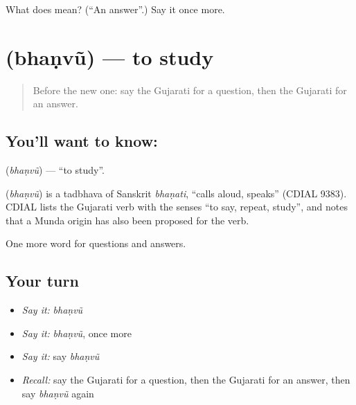\begin{tcolorbox}[breakable,colback=teal!4,colframe=teal!35!black,title={Before you move on}]
What does  mean? (\textquotedblleft{}An answer\textquotedblright{}.) Say it once more.
\end{tcolorbox}
\section[\texorpdfstring{\gu{ભણવું} (bhaṇvũ)}{ભણવું (bhaṇvũ)}]{ (bhaṇvũ) — to study}

\label{lesson:GU-C89-bhanvu}



\begin{quote}
Before the new one: say the Gujarati for a question, then the Gujarati for an answer.
\end{quote}

\subsection*{You'll want to know: }
\textbf{} (\emph{bhaṇvũ}) — \textquotedblleft{}to study\textquotedblright{}.

\begin{cousinweb}
\textbf{} (\emph{bhaṇvũ}) is a tadbhava of Sanskrit \emph{bhaṇati}, \textquotedblleft{}calls aloud, speaks\textquotedblright{} (CDIAL 9383). CDIAL lists the Gujarati verb with the senses \textquotedblleft{}to say, repeat, study\textquotedblright{}, and notes that a Munda origin has also been proposed for the verb.
\end{cousinweb}

\begin{grammarlens}[title={What you've built}]
One more word for questions and answers.
\end{grammarlens}

\subsection*{Your turn}
\begin{itemize}
\raggedright
  \item \emph{Say it:} \emph{bhaṇvũ}
  \item \emph{Say it:} \emph{bhaṇvũ}, once more
  \item \emph{Say it:} say \emph{bhaṇvũ}
  \item \emph{Recall:} say the Gujarati for a question, then the Gujarati for an answer, then say \emph{bhaṇvũ} again
\end{itemize}

